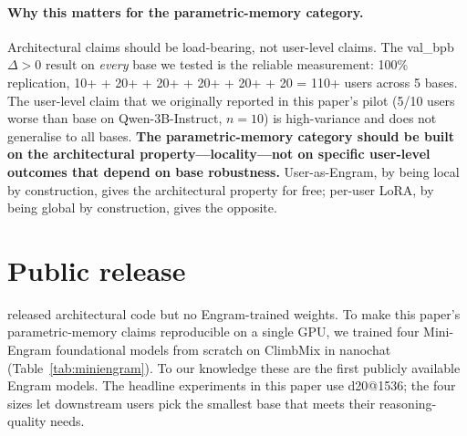 \documentclass{article}
\begin{document}
\paragraph{Why this matters for the parametric-memory category.}
Architectural claims should be load-bearing, not user-level claims.
The val\_bpb $\Delta>0$ result on \emph{every} base we tested is the
reliable measurement: 100\% replication, 10+ + 20+ + 20+ + 20+ + 20+
+ 20 = 110+ users across 5 bases. The user-level claim that we
originally reported in this paper's pilot (5/10 users worse than base
on Qwen-3B-Instruct, $n{=}10$) is high-variance and does not
generalise to all bases. \textbf{The parametric-memory category
should be built on the architectural property—locality—not on
specific user-level outcomes that depend on base robustness.} User-as-Engram, by being local by construction, gives the architectural
property for free; per-user LoRA, by being global by construction,
gives the opposite.


\section{Public release}
\label{sec:repro}

\citet{cheng2026engram} released architectural code but no
Engram-trained weights. To make this paper's parametric-memory claims
reproducible on a single GPU, we trained four Mini-Engram foundational
models from scratch on ClimbMix in nanochat~\citep{karpathy2026nanochat}
(Table~\ref{tab:miniengram}). To our knowledge these are the first
publicly available Engram models. The headline experiments in this
paper use d20@1536; the four sizes let downstream users pick the
smallest base that meets their reasoning-quality needs.
\end{document}
